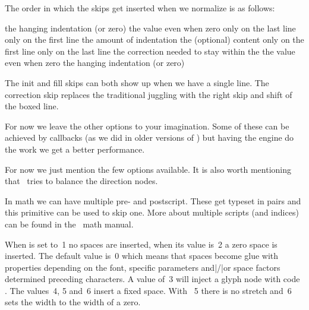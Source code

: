 \starttworows
{}
\stoptworows

The order in which the skips get inserted when we normalize is as follows:

\starttabulate
\NC {}     \NC the hanging indentation (or zero) \NC \NR
\NC {}         \NC the value even when zero \NC \NR
\NC {}  \NC only on the last line \NC \NR
\NC {}  \NC only on the first line \NC \NR
\NC {}       \NC the amount of indentation \NC \NR
\NC \unknown                \NC the (optional) content \NC \NR
\NC {} \NC only on the first line \NC \NR
\NC {} \NC only on the last line \NC \NR
\NC {}   \NC the correction needed to stay within the  \NC \NR
\NC {}        \NC the value even when zero \NC \NR
\NC {}    \NC the hanging indentation (or zero) \NC \NR
\stoptabulate

The init and fill skips can both show up when we have a single line. The
correction skip replaces the traditional juggling with the right skip and shift
of the boxed line.

For now we leave the other options to your imagination. Some of these can be
achieved by callbacks (as we did in older versions of \CONTEXT) but having the
engine do the work we get a better performance.

\stopnewprimitive

\startnewprimitive[title={\prm {normalizeparmode}}]

For now we just mention the few options available. It is also worth mentioning that
\LUAMETATEX\ tries to balance the direction nodes.

\starttworows
{}
\stoptworows

\stopnewprimitive

\startnewprimitive[title={\prm {noscript}}]

In math we can have multiple pre- and postscript. These get typeset in pairs and
this primitive can be used to skip one. More about multiple scripts (and indices)
can be found in the \CONTEXT\ math manual.

\stopnewprimitive

\startnewprimitive[title={\prm {nospaces}}]

When  is set to~1 no spaces are inserted, when its value is~2 a
zero space is inserted. The default value is~0 which means that spaces become
glue with properties depending on the font, specific parameters and|/|or space
factors determined preceding characters. A value of~3 will inject a glyph node
with code . The values~4, 5 and~6 insert a fixed space. With ~5
there is no stretch and~6 sets the width to the width of a zero.

